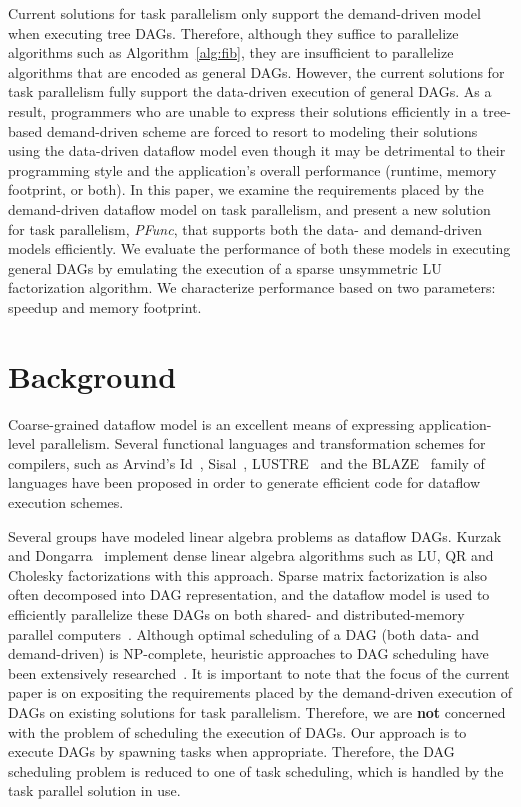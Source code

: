 \documentclass[10pt,conference]{IEEEtran}
\begin{document}
%
%
Current solutions for task parallelism only support the demand-driven model
when executing tree DAGs. Therefore, although they suffice to parallelize
algorithms such as Algorithm~\ref{alg:fib}, they are insufficient to
parallelize algorithms that are encoded as general DAGs. However,
the current solutions for task parallelism fully support the data-driven
execution of general DAGs.
%
As a result, programmers who are unable to express their solutions
efficiently in a tree-based demand-driven scheme are forced to resort to
modeling their solutions using the data-driven dataflow model even though it
may be detrimental to their programming style and the application's overall
performance (runtime, memory footprint, or both). In this paper, we examine the
requirements placed by the demand-driven dataflow model on task parallelism,
and present a new solution for task parallelism, \textit{PFunc}, that supports
both the data- and demand-driven models efficiently.  We evaluate the
performance of both these models in executing general DAGs by emulating the
execution of a sparse unsymmetric LU factorization algorithm.  We characterize
performance  based on two parameters: speedup and memory footprint.  

\section{Background}
\label{sec:back}
Coarse-grained dataflow model is an excellent means of expressing
application-level parallelism.  Several functional languages and transformation
schemes for compilers, such as Arvind's Id~\cite{Arvind78},
Sisal~\cite{Feo1990}, LUSTRE~\cite{Caspi1987} and the
BLAZE~\cite{Mehrotra88programmingparallel} family of languages have been
proposed in order to generate efficient code for dataflow execution schemes.
%

Several groups have modeled linear algebra problems as dataflow DAGs. Kurzak
and Dongarra~\cite{kurzak08} implement dense linear algebra algorithms such as
LU, QR and Cholesky factorizations with this approach.  Sparse matrix
factorization is also often decomposed into DAG representation, and the
dataflow model is used to efficiently parallelize these DAGs on both shared-
and distributed-memory parallel
computers~\cite{GUPTA00wsmp2,GUPTAsimax01,HADFIELDthesis,DEMMEL97tr943}.
Although optimal scheduling of a DAG (both data- and demand-driven) is
NP-complete, heuristic approaches to DAG scheduling have been extensively
researched~\cite{KWOK99jpdc, KWOK99acm, GERAS92jpdc, SHIRAZI90jpdc}. It is
important to note that the focus of the current paper is on expositing the
requirements placed by the demand-driven execution of DAGs on existing
solutions for task parallelism.  Therefore, we are \textbf{not} concerned with
the problem of scheduling the execution of DAGs. Our approach is to execute
DAGs by spawning tasks when appropriate.  Therefore, the DAG scheduling problem
is reduced to one of task scheduling, which is handled by the task parallel
solution in use.
\end{document}
